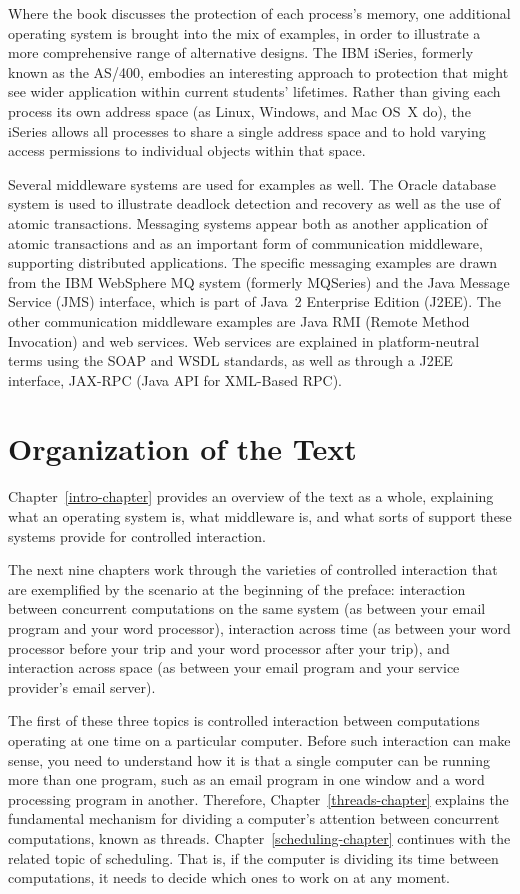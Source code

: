 Where the book discusses the protection of each process's memory, one
additional operating system is brought into the mix of examples, in
order to illustrate a more comprehensive range of alternative
designs.  The IBM iSeries, formerly known as the AS/400, embodies an
interesting approach to protection that might see wider application
within current students' lifetimes.  Rather than giving each process
its own address space (as Linux, Windows, and Mac OS~X do), the
iSeries allows all processes to share a single address space and to
hold varying access permissions to individual objects within that
space.

Several middleware systems are used for examples as well.  The Oracle
database system is used to illustrate deadlock detection and recovery
as well as the use of atomic transactions.  Messaging systems appear
both as another application of atomic transactions and as an important
form of communication middleware, supporting distributed
applications.  The specific messaging examples are drawn from the IBM
WebSphere MQ system (formerly MQSeries) and the Java
Message Service (JMS) interface, which is part of Java~2 Enterprise
Edition (J2EE).  The other communication middleware examples are Java
RMI (Remote Method Invocation) and web services.  Web services are
explained in platform-neutral terms using the SOAP and WSDL standards,
as well as through a J2EE interface, JAX-RPC (Java API for XML-Based RPC).

\section*{Organization of the Text}

Chapter~\ref{intro-chapter} provides an overview of the text as a
whole, explaining what an operating system is, what middleware is, and
what sorts of support these systems provide for controlled
interaction.

The next nine chapters work through the varieties of controlled
interaction that are exemplified by the scenario at the beginning of
the preface: interaction between concurrent computations on the same
system (as between your email program and your word processor),
interaction across time (as between your word processor before your
trip and your word processor after your trip), and interaction across
space (as between your email program and your service provider's email
server).

The first of these three topics is controlled interaction between
computations operating at one time on a particular computer.  Before
such interaction can make sense, you need to understand how it is that
a single computer can be running more than one program, such as an
email program in one window and a word processing program in another.
Therefore, Chapter~\ref{threads-chapter} explains the fundamental
mechanism for dividing a computer's attention between concurrent
computations, known as threads.  Chapter~\ref{scheduling-chapter}
continues with the related topic of scheduling.  That is, if the
computer is dividing its time between computations, it needs to decide
which ones to work on at any moment.

